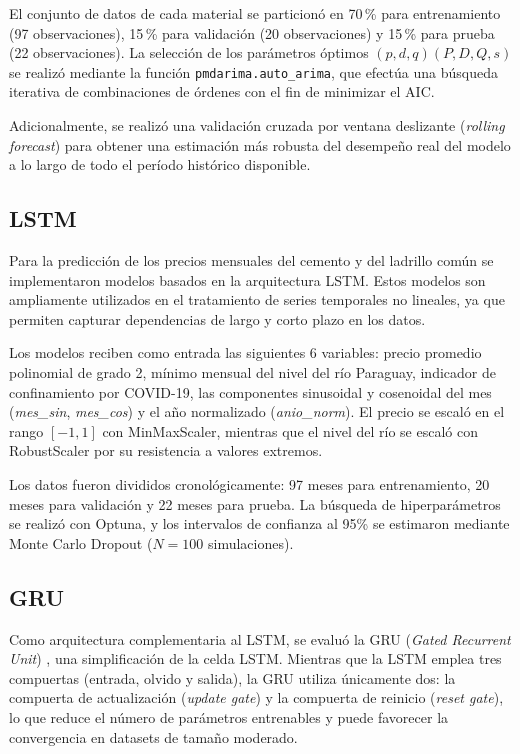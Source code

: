 \justify
El conjunto de datos de cada material se particionó en 70\,\% para entrenamiento (97 observaciones), 15\,\% para validación (20 observaciones) y 15\,\% para prueba (22 observaciones). La selección de los parámetros óptimos $(p, d, q)(P, D, Q, s)$ se realizó mediante la función \texttt{pmdarima.auto\_arima}, que efectúa una búsqueda iterativa de combinaciones de órdenes con el fin de minimizar el AIC.

\justify
Adicionalmente, se realizó una validación cruzada por ventana deslizante (\textit{rolling forecast}) para obtener una estimación más robusta del desempeño real del modelo a lo largo de todo el período histórico disponible.

\subsection{LSTM}
\justify
Para la predicción de los precios mensuales del cemento y del ladrillo común se implementaron modelos basados en la arquitectura LSTM. Estos modelos son ampliamente utilizados en el tratamiento de series temporales no lineales, ya que permiten capturar dependencias de largo y corto plazo en los datos.

\justify
Los modelos reciben como entrada las siguientes 6 variables: precio promedio polinomial de grado 2, mínimo mensual del nivel del río Paraguay, indicador de confinamiento por COVID-19, las componentes sinusoidal y cosenoidal del mes (\textit{mes\_sin}, \textit{mes\_cos}) y el año normalizado (\textit{anio\_norm}). El precio se escaló en el rango $[-1, 1]$ con MinMaxScaler, mientras que el nivel del río se escaló con RobustScaler por su resistencia a valores extremos.

\justify
Los datos fueron divididos cronológicamente: 97 meses para entrenamiento, 20 meses para validación y 22 meses para prueba. La búsqueda de hiperparámetros se realizó con Optuna, y los intervalos de confianza al 95\% se estimaron mediante Monte Carlo Dropout ($N=100$ simulaciones).

\subsection{GRU}
\justify
Como arquitectura complementaria al LSTM, se evaluó la GRU (\textit{Gated Recurrent Unit}) \cite{cho2014learning}, una simplificación de la celda LSTM. Mientras que la LSTM emplea tres compuertas (entrada, olvido y salida), la GRU utiliza únicamente dos: la compuerta de actualización (\textit{update gate}) y la compuerta de reinicio (\textit{reset gate}), lo que reduce el número de parámetros entrenables y puede favorecer la convergencia en datasets de tamaño moderado.

